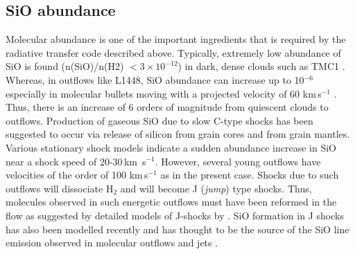 \documentclass[useAMS,usenatbib]{mn2e}
\begin{document}
\subsection{SiO abundance}
\label{ssec:sioabun}
Molecular abundance is one of the important ingredients that is
required by the radiative transfer code described above. 
Typically, extremely low abundance of SiO is
found (n(SiO)/n(H2) $< 3\times10^{-12}$) in dark, dense clouds such
as TMC1 \citep{Ziurys:1989p14699,MartinPintado:1992p14309}. Whereas, in
outflows like L1448, SiO abundance can increase up to 10$^{-6}$ especially in
molecular bullets moving with a projected velocity of 60
km\,s$^{-1}$ \citep{Dutrey:1997p11185}. Thus, there is
an increase of 6 orders of magnitude from quiescent clouds
to outflows. Production of
gaseous SiO due to slow C-type shocks has been suggested to occur via release of
silicon from grain cores and from grain mantles. Various stationary
shock models indicate a sudden abundance increase in SiO 
near a shock speed of 20-30\,km\, s$^{-1}$. However, several young
outflows have velocities of the order of 100 km\,s$^{-1}$ as in the present
case. Shocks due to such outflows will dissociate H$_{2}$ and will
become J ({\em{jump}}) type shocks. Thus, molecules observed in such
energetic outflows must have been reformed in the flow as suggested by
detailed models of J-shocks by \cite{Neufeld:1989p14322}. SiO formation in J shocks
has also been modelled recently and has thought to be the source of
the SiO line emission observed in molecular outflows and jets
\citep{Guillet:2009p11229}.
%
\end{document}
